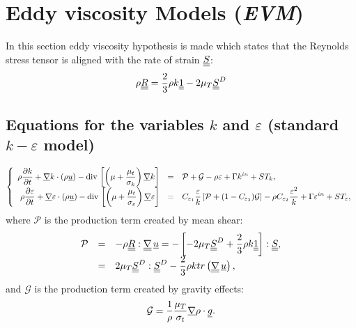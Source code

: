 \section{Eddy viscosity Models (\emph{EVM})}
In this section eddy viscosity hypothesis is made which states that the Reynolds stress tensor
is aligned with the rate of strain $\underline{\underline{S}}$:
%
\begin{equation}
\rho  \underline{\underline{R}} = \dfrac{2}{3} \rho k \underline{\underline{1}} - 2 \mu_T \underline{\underline{S}}^D
\end{equation}

\subsection{Equations for the variables $k$ and $\varepsilon$ (standard $k-\varepsilon$ model)}

\hypertarget{keps}{}

\begin{equation}
\left\{
\begin{array}{r c l}
\displaystyle
\rho \dfrac{\partial k }{\partial t} + \underline{\nabla} k \cdot \left( \rho \underline{u} \right)
- \text{div}\, \left[ \left( \mu +\frac{\mu _{t}}{\sigma _{k}} \right)\underline{\nabla}{k}\right]
&=&\displaystyle
\mathcal{P}+\mathcal{G}-\rho \varepsilon +\Gamma k^{in}+ST_{k}, \\
\displaystyle
\rho \dfrac{\partial  \varepsilon }{\partial t} + \underline{\nabla} \varepsilon \cdot \left(\rho \underline{u} \right)
-\text{div}\, \left[ \left( \mu +\frac{\mu _{t}}{\sigma _{\varepsilon }} \right) \underline{\nabla}{\varepsilon}\right]
&=& \displaystyle
C_{\varepsilon _{1}}\frac{\varepsilon }{k}\left[
\mathcal{P}+(1-C_{\varepsilon _{3}})\mathcal{G}\right] -\rho C_{\varepsilon
_{2}}\frac{\varepsilon ^{2}}{k}+\Gamma \varepsilon ^{in}+ST_{\varepsilon },
\end{array}
\right.
\end{equation}
where $\mathcal{P}$ is the production term created by mean shear:
%
\begin{equation}
\begin{array}{rcl}
\mathcal{P} & = & \displaystyle -\rho \underline{\underline{R}} : \underline{\underline{{\nabla}}} \, \underline{u}
= -\left[-2 \mu_T \underline{\underline{S}}^D
+ \frac{2}{3}\rho k \underline{\underline{1}}\right] : \underline{\underline{S}}, \\
& = & \displaystyle
2 \mu_T  \underline{\underline{S}}^D: \underline{\underline{S}}^D
-\dfrac{2}{3}
\rho k tr \left( \underline{\underline{{\nabla}}} \,\underline{u} \right),
\end{array}
\end{equation}
and
$\mathcal{G}$ is the production term created by gravity effects:
\begin{equation}
\displaystyle \mathcal{G}= \frac{1}{\rho}\frac{\mu_T}{\sigma_t} \underline{\nabla} \rho \cdot \underline{g}.
\end{equation}


